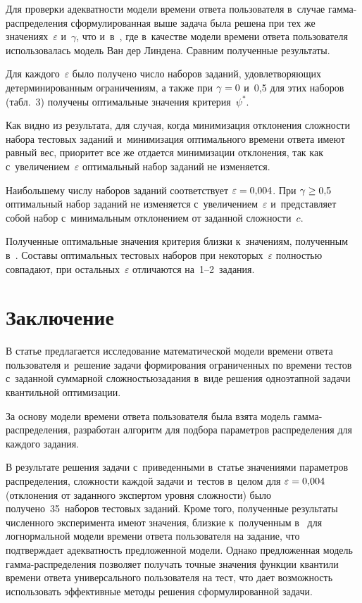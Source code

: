 \begin{multicols}{2}
    Для проверки адекватности модели времени ответа пользователя в~случае 
гамма-распределения сформулированная выше задача была решена при тех же 
значениях~$\varepsilon$ и~$\gamma$, что и~в~\cite{8-b}, где в~качестве модели 
времени ответа пользователя использовалась модель Ван дер Линдена. Сравним 
полученные результаты.
    
    Для каждого~$\varepsilon$ было получено число наборов заданий, 
удовлетворяющих детерминированным ограничениям, а также при 
$\gamma\hm=0$ и~0{,}5 для этих наборов (табл.~3) получены 
оптимальные значения критерия~$\psi^*$.
    
    Как видно из результата, для случая, когда минимизация отклонения 
сложности набора тестовых заданий и~минимизация оптимального времени 
ответа имеют равный вес, приоритет все же отдается минимизации отклонения, 
так как с~увеличением~$\varepsilon$ оптимальный набор заданий не 
изменяется.
    

    
    Наибольшему числу наборов заданий соответствует $\varepsilon\hm = 
0{,}004$. При $\gamma\hm\geq 0{,}5$ оптимальный набор заданий не 
изменяется с~увеличением~$\varepsilon$ и~пред\-став\-ля\-ет собой набор 
с~минимальным отклонением от заданной сложности~$c$. 
    
    Полученные оптимальные значения критерия близки к~значениям, 
полученным в~\cite{8-b}. Составы оптимальных тестовых наборов при 
некоторых~$\varepsilon$ полностью совпадают, при остальных~$\varepsilon$ 
отличаются на~1--2~задания.
    
\section{Заключение}

    В статье предлагается исследование математической модели времени 
ответа пользователя и~решение задачи формирования ограниченных по времени 
тес\-тов с~заданной суммарной слож\-ностью\linebreak задания в~виде решения одноэтапной 
задачи квантильной оптимизации.
    
    За основу модели времени ответа пользователя была взята модель  
гам\-ма-рас\-пре\-де\-ле\-ния, разработан алгоритм для подбора па\-ра\-мет\-ров 
рас\-пре\-де\-ле\-ния для каждого задания.
    
    В результате решения задачи с~приведенными в~статье значениями 
па\-ра\-мет\-ров распределения, слож\-ности каждой задачи и~тестов в~целом для 
$\varepsilon\hm= 0{,}004$ (отклонения от заданного экспертом уровня 
слож\-ности) было получено~35~наборов тес\-то\-вых заданий. Кроме того, 
полученные результаты чис\-лен\-но\-го эксперимента имеют значения, близ\-кие 
к~полученным в~\cite{8-b} для логнормальной модели времени ответа 
пользователя на задание, что подтверждает адекватность предложенной 
модели. Однако предложенная модель гам\-ма-рас\-пре\-де\-ле\-ния позволяет 
получать точ\-ные значения функции квантили времени ответа универсального 
пользователя на тест, что дает воз\-мож\-ность использовать эффективные методы 
решения сформулированной задачи.
    

\end{multicols}
